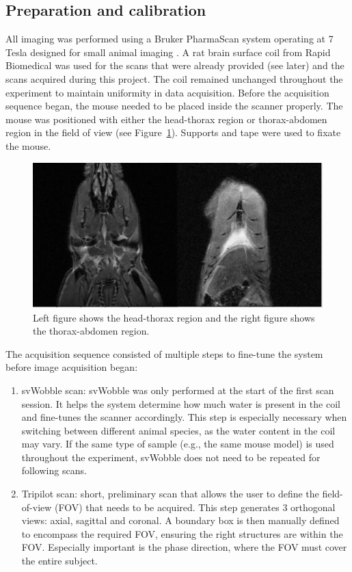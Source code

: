 \documentclass[twocolumn]{article}
\begin{document}
\subsection{Preparation and calibration }

All imaging was performed using a Bruker PharmaScan system operating at 7 Tesla designed for small animal imaging \cite{bruker2025pharmascan}. A rat brain surface coil from Rapid Biomedical was used for the scans that were already provided (see later) and the scans acquired during this project. The coil remained unchanged throughout the experiment to maintain uniformity in data acquisition.
Before the acquisition sequence began, the mouse needed to be placed inside the scanner properly. The mouse was positioned with either the head-thorax region or thorax-abdomen region in the field of view (see Figure~\ref{fig:head-thorax}). Supports and tape were used to fixate the mouse. 

\begin{figure}[H]
    \centering
    \includegraphics[width=0.95\linewidth]{head-thorax.png}
    \caption{Left figure shows the head-thorax region and the right figure shows the thorax-abdomen region.}
    \label{fig:head-thorax}
\end{figure}

The acquisition sequence consisted of multiple steps to fine-tune the system before image acquisition began: 

\begin{enumerate}
\item svWobble scan: svWobble was only performed at the start of the first scan session. It helps the system determine how much water is present in the coil and fine-tunes the scanner accordingly. This step is especially necessary when switching between different animal species, as the water content in the coil may vary. If the same type of sample (e.g., the same mouse model) is used throughout the experiment, svWobble does not need to be repeated for following scans.
\item Tripilot scan:  short, preliminary scan that allows the user to define the field-of-view (FOV) that needs to be acquired. This step generates 3 orthogonal views: axial, sagittal and coronal. A boundary box is then manually defined to encompass the required FOV, ensuring the right structures are within the FOV. Especially important is the phase direction, where the FOV must cover the entire subject.
\end{enumerate}
\end{document}
